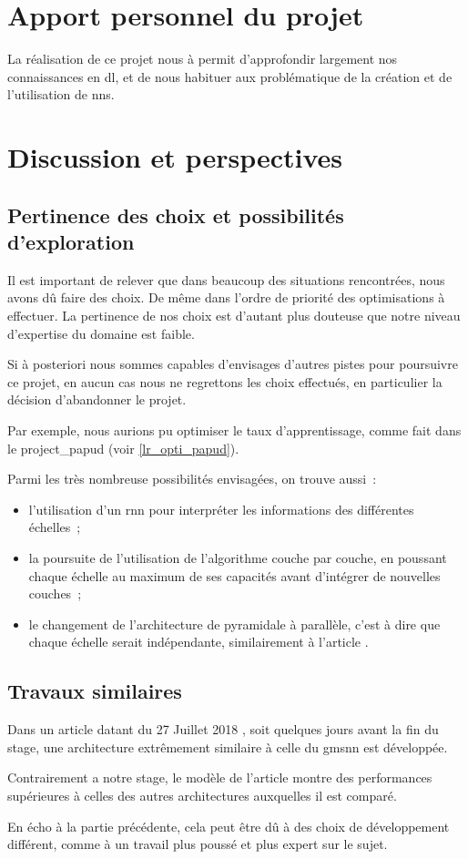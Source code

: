 \section{Apport personnel du projet}
La réalisation de ce projet nous à permit d'approfondir largement nos connaissances en \gls{dl}, et de nous habituer aux problématique de la création et de l'utilisation de \glspl{nn}.

\section{Discussion et perspectives}
\subsection{Pertinence des choix et possibilités d'exploration}
Il est important de relever que dans beaucoup des situations rencontrées, nous avons dû faire des choix. De même dans l'ordre de priorité des optimisations à effectuer. La pertinence de nos choix est d'autant plus douteuse que notre niveau d'expertise du domaine est faible.

Si à posteriori nous sommes capables d'envisages d'autres pistes pour poursuivre ce projet, en aucun cas nous ne regrettons les choix effectués, en particulier la décision d'abandonner le projet.

Par exemple, nous aurions pu optimiser le taux d'apprentissage, comme fait dans le \gls{project_papud} (voir \autoref{lr_opti_papud}).

Parmi les très nombreuse possibilités envisagées, on trouve aussi~:
\begin{itemize}
	\item l'utilisation d'un \gls{rnn} pour interpréter les informations des différentes échelles~;
	\item la poursuite de l'utilisation de l'algorithme couche par couche, en poussant chaque échelle au maximum de ses capacités avant d'intégrer de nouvelles couches~;
	\item le changement de l'architecture de pyramidale à parallèle, c'est à dire que chaque échelle serait indépendante, similairement à l'article \autocite{Xiao2018Jan}.
\end{itemize}

\subsection{Travaux similaires}
Dans un article datant du 27 Juillet 2018 \autocite{hierachical_rnn}, soit quelques jours avant la fin du stage, une architecture extrêmement similaire à celle du \gls{gmsnn} est développée.

Contrairement a notre stage, le modèle de l'article montre des performances supérieures à celles des autres architectures auxquelles il est comparé.

En écho à la partie précédente, cela peut être dû à des choix de développement différent, comme à un travail plus poussé et plus expert sur le sujet.

